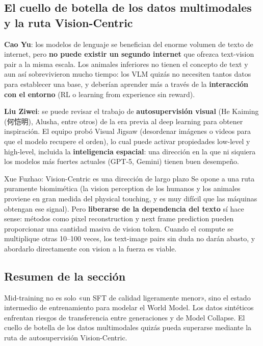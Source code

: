 \subsection{El cuello de botella de los datos multimodales y la ruta Vision-Centric}

\textbf{Cao Yu}: los modelos de lenguaje se benefician del enorme volumen de texto de internet, pero \textbf{no puede existir un segundo internet} que ofrezca text-vision pair a la misma escala. Los animales inferiores no tienen el concepto de text y aun así sobrevivieron mucho tiempo: los VLM quizás no necesiten tantos datos para establecer una base, y deberían aprender más a través de la \textbf{interacción con el entorno} (RL o learning from experience sin reward).

\textbf{Liu Ziwei}: se puede revisar el trabajo de \textbf{autosupervisión visual} (He Kaiming (何恺明), Alusha, entre otros) de la era previa al deep learning para obtener inspiración. El equipo probó Visual Jigsaw (desordenar imágenes o videos para que el modelo recupere el orden), lo cual puede activar propiedades low-level y high-level, incluida la \textbf{inteligencia espacial}: una dirección en la que ni siquiera los modelos más fuertes actuales (GPT-5, Gemini) tienen buen desempeño.

\begin{importantbox}{Xue Fuzhao: Vision-Centric es una dirección de largo plazo}
Se opone a una ruta puramente biomimética (la vision perception de los humanos y los animales proviene en gran medida del physical touching, y es muy difícil que las máquinas obtengan ese signal). Pero \textbf{liberarse de la dependencia del texto} sí hace sense: métodos como pixel reconstruction y next frame prediction pueden proporcionar una cantidad masiva de vision token. Cuando el compute se multiplique otras 10--100 veces, los text-image pairs sin duda no darán abasto, y abordarlo directamente con vision a la fuerza es viable.
\end{importantbox}

\subsection{Resumen de la sección}
Mid-training no es solo «un SFT de calidad ligeramente menor», sino el estado intermedio de entrenamiento para modelar el World Model. Los datos sintéticos enfrentan riesgos de transferencia entre generaciones y de Model Collapse. El cuello de botella de los datos multimodales quizás pueda superarse mediante la ruta de autosupervisión Vision-Centric.

